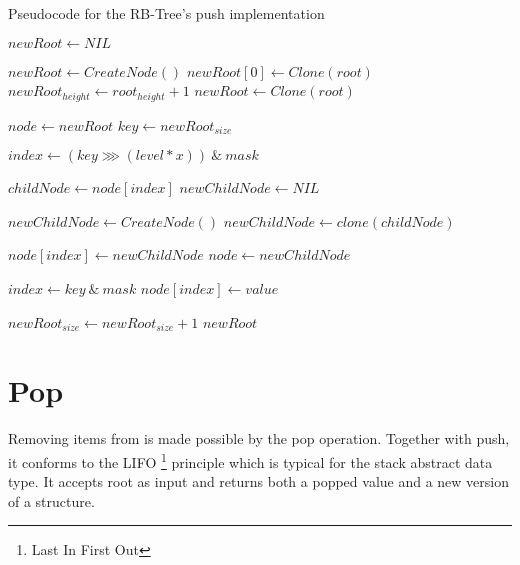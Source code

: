 \begin{listing}[ht!]        
    \caption{Pseudocode for the RB-Tree's push implementation}
    \label{lst:rb-tree-push}
    
    \begin{algorithmic}
            \State $newRoot \leftarrow NIL$

                \State $newRoot \leftarrow CreateNode()$
                \State $newRoot[0] \leftarrow Clone(root)$
                \State $newRoot_{height} \leftarrow root_{height} + 1$
            \Else 
                \State $newRoot \leftarrow Clone(root)$
            \EndIf
                        
            \State $node \leftarrow newRoot$
            \State $key \leftarrow newRoot_{size}$
    
                \State $index \leftarrow (key \ggg (level * x))\ \&\ mask$
                
                \State $childNode \leftarrow node[index]$
                \State $newChildNode \leftarrow NIL$

                    \State $newChildNode \leftarrow CreateNode()$
                \Else
                    \State $newChildNode \leftarrow clone(childNode)$
                \EndIf
                
                \State $node[index] \leftarrow newChildNode$
                \State $node \leftarrow newChildNode$
            \EndFor        
    
            \State $index \leftarrow key\ \&\ mask$
            \State $node[index] \leftarrow value$ 

            \State $newRoot_{size} \leftarrow newRoot_{size} + 1$
            \State \Return $newRoot$
        \EndFunction
    \end{algorithmic}
\end{listing}

\section{Pop}

Removing items from \rbtree{} is made possible by the pop operation. Together with push, it conforms to the LIFO \footnote{Last In First Out} principle which is typical for the stack abstract data type. It accepts root as input and returns both a popped value and a new version of a structure. 

